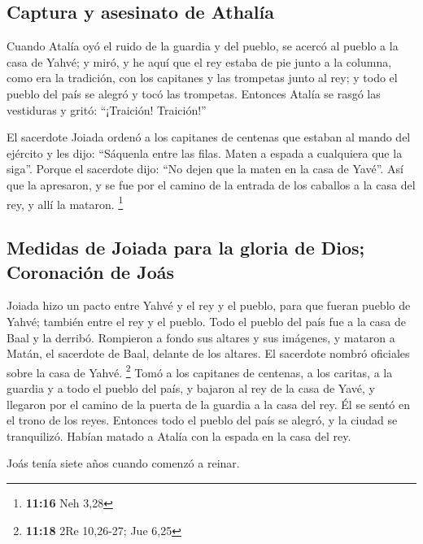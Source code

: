 \begin{paracol}{2}
\hypertarget{captura-y-asesinato-de-athaluxeda}{%
\subsection{Captura y asesinato de
Athalía}\label{captura-y-asesinato-de-athaluxeda}}

 Cuando Atalía oyó el ruido de la guardia y del pueblo,
se acercó al pueblo a la casa de Yahvé;  y miró, y he
aquí que el rey estaba de pie junto a la columna, como era la tradición,
con los capitanes y las trompetas junto al rey; y todo el pueblo del
país se alegró y tocó las trompetas. Entonces Atalía se rasgó las
vestiduras y gritó: ``¡Traición! Traición!''

 El sacerdote Joiada ordenó a los capitanes de centenas
que estaban al mando del ejército y les dijo: ``Sáquenla entre las
filas. Maten a espada a cualquiera que la siga''. Porque el sacerdote
dijo: ``No dejen que la maten en la casa de Yavé''.  Así
que la apresaron, y se fue por el camino de la entrada de los caballos a
la casa del rey, y allí la mataron. \footnote{\textbf{11:16} Neh 3,28}

\hypertarget{medidas-de-joiada-para-la-gloria-de-dios-coronaciuxf3n-de-jouxe1s}{%
\subsection{Medidas de Joiada para la gloria de Dios; Coronación de
Joás}\label{medidas-de-joiada-para-la-gloria-de-dios-coronaciuxf3n-de-jouxe1s}}

 Joiada hizo un pacto entre Yahvé y el rey y el pueblo,
para que fueran pueblo de Yahvé; también entre el rey y el pueblo.
 Todo el pueblo del país fue a la casa de Baal y la
derribó. Rompieron a fondo sus altares y sus imágenes, y mataron a
Matán, el sacerdote de Baal, delante de los altares. El sacerdote nombró
oficiales sobre la casa de Yahvé. \footnote{\textbf{11:18} 2Re 10,26-27;
  Jue 6,25}  Tomó a los capitanes de centenas, a los
caritas, a la guardia y a todo el pueblo del país, y bajaron al rey de
la casa de Yavé, y llegaron por el camino de la puerta de la guardia a
la casa del rey. Él se sentó en el trono de los reyes. 
Entonces todo el pueblo del país se alegró, y la ciudad se tranquilizó.
Habían matado a Atalía con la espada en la casa del rey.

 Joás tenía siete años cuando comenzó a reinar.


\end{paracol}
